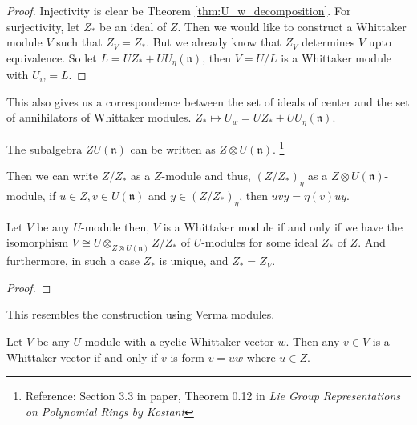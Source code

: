 \documentclass{article}
\theoremstyle{mytheoremstyle}
\theoremstyle{mytheoremstyle}
\theoremstyle{myproblemstyle}
\begin{document}
    \begin{proof}[Proof]
    	Injectivity is clear be Theorem \ref{thm:U_w_decomposition}. 
	For surjectivity, let $Z_*$ be an ideal of $Z$.
	Then we would like to construct a Whittaker module $V$ such that $Z_V = Z_*$. 
	But we already know that $Z_V$ determines $V$ upto equivalence. 
	So let $L = UZ_* + UU_\eta(\mathfrak n)$, then $V = U/L$ is a Whittaker module with $U_w = L$.
    \end{proof}

    \begin{remark}
    	This also gives us a correspondence between the set of ideals of center and the set of annihilators of Whittaker modules.
	$Z_* \mapsto U_w = UZ_* + UU_\eta(\mathfrak n)$.
    \end{remark}
    
    \begin{fact}
      The subalgebra $ZU(\mathfrak n)$ can be written as $Z \otimes U(\mathfrak n)$. 
      \footnote{Reference: Section 3.3 in paper, Theorem 0.12 in \emph{Lie Group Representations on Polynomial Rings by Kostant}}

      Then we can write $Z/Z_*$ as a $Z$-module and thus,
      $(Z/Z_*)_\eta$ as a $Z\otimes U(\mathfrak n)$-module, if $u \in Z, v \in U(\mathfrak n)$ 
      and $y \in (Z/Z_*)_\eta$, then $uvy = \eta(v)uy$.
    \end{fact}

    \begin{theorem}
      Let $V$ be any $U$-module then, $V$ is a Whittaker module if and only if we have the isomorphism 
      $V \cong U \otimes_{Z \otimes U(\mathfrak n)} Z/Z_*$ of $U$-modules for some ideal $Z_*$ of $Z$.
      And furthermore, in such a case $Z_*$ is unique, and $Z_* = Z_V$.
    \end{theorem}
    
    \begin{proof}[Proof]
    \end{proof}

    \begin{remark}
    	This resembles the construction using Verma modules.
    \end{remark}
    


    \begin{theorem}
      Let $V$ be any $U$-module with a cyclic Whittaker vector $w$. Then any $v \in V$ is a Whittaker vector if and only if 
      $v$ is form $v = uw$ where $u \in Z$.
    \end{theorem}
\end{document}
